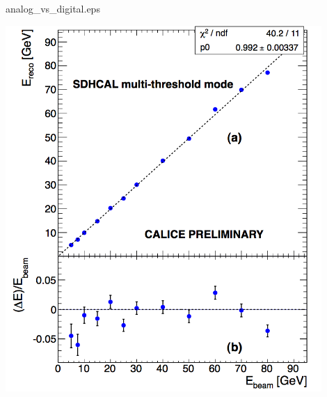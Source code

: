 \documentclass[10pt]{beamer}
\begin{document}
\begin{frame}{analog\_vs\_digital.eps}
    \centerline{\includegraphics[width=0.9\textwidth]{images/Beam2012Linearity}}
\end{frame}
\end{document}

